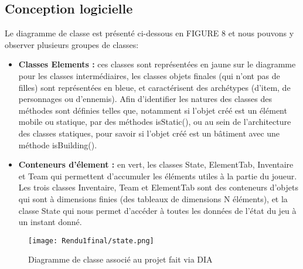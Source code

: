 \documentclass[a4paper,12pt]{article}
\begin{document}
\subsection{Conception logicielle}
Le diagramme de classe est présenté ci-dessous en FIGURE 8 et nous pouvons y observer plusieurs groupes de classes: 
\begin{itemize}
    \item \textbf{Classes Elements :} ces classes sont représentées en jaune sur le diagramme pour les classes intermédiaires, les classes objets finales (qui n'ont pas de filles) sont représentées en bleue, et caractérisent des archétypes (d'item, de personnages ou d'ennemis). Afin d'identifier les natures des classes des méthodes sont définies telles que, notamment si l'objet créé est un élément mobile ou statique, par des méthodes isStatic(), ou au sein de l'architecture des classes statiques, pour savoir si l'objet créé est un bâtiment avec une méthode isBuilding(). 
    \item \textbf{Conteneurs d'élement :} en vert, les classes State, ElementTab, Inventaire et Team qui permettent d'accumuler les éléments utiles à la partie du joueur. Les trois classes Inventaire, Team et ElementTab sont des conteneurs d'objets qui sont à dimensions finies (des tableaux de dimensions N éléments), et la classe State qui nous permet d'accéder à toutes les données de l'état du jeu à un instant donné. 
\end{itemize}

\begin{figure}[!ht]
  \centering
  \texttt{[image: Rendu1final/state.png]}
  \caption{Diagramme de classe associé au projet fait via DIA}
\end{figure}
\end{document}
